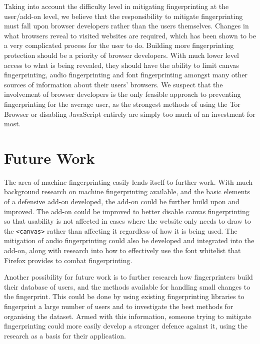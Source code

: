 Taking into account the difficulty level in mitigating fingerprinting at the user/add-on level, we believe that the responsibility to mitigate fingerprinting must fall upon browser developers rather than the users themselves.
Changes in what browsers reveal to visited websites are required, which has been shown to be a very complicated process for the user to do.
Building more fingerprinting protection should be a priority of browser developers.
With much lower level access to what is being revealed, they should have the ability to limit canvas fingerprinting, audio fingerprinting and font fingerprinting amongst many other sources of information about their users' browsers.
We suspect that the involvement of browser developers is the only feasible approach to preventing fingerprinting for the average user, as the strongest methods of using the Tor Browser or disabling JavaScript entirely are simply too much of an investment for most.

\section{Future Work}

The area of machine fingerprinting easily lends itself to further work.
With much background research on machine fingerprinting available, and the basic elements of a defensive add-on developed, the add-on could be further build upon and improved.
The add-on could be improved to better disable canvas fingerprinting so that usability is not affected in cases where the website only needs to draw to the \texttt{<canvas>} rather than affecting it regardless of how it is being used.
The mitigation of audio fingerprinting could also be developed and integrated into the add-on, along with research into how to effectively use the font whitelist that Firefox provides to combat fingerprinting.

Another possibility for future work is to further research how fingerprinters build their database of users, and the methods available for handling small changes to the fingerprint.
This could be done by using existing fingerprinting libraries to fingerprint a large number of users and to investigate the best methods for organising the dataset.
Armed with this information, someone trying to mitigate fingerprinting could more easily develop a stronger defence against it, using the research as a basis for their application.

